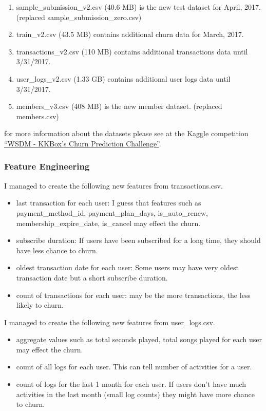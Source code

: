 \documentclass[11pt]{article}
\begin{document}
\begin{enumerate}
\def\labelenumi{\arabic{enumi}.}
\setcounter{enumi}{5}
\itemsep1pt\parskip0pt
\item
  sample\_submission\_v2.csv (40.6 MB) is the new test dataset for
  April, 2017. (replaced sample\_submission\_zero.csv)
\item
  train\_v2.csv (43.5 MB) contains additional churn data for March,
  2017.
\item
  transactions\_v2.csv (110 MB) contains additional transactions data
  until 3/31/2017.
\item
  user\_logs\_v2.csv (1.33 GB) contains additional user logs data until
  3/31/2017.
\item
  members\_v3.csv (408 MB) is the new member dataset. (replaced
  members.csv)
\end{enumerate}

for more information about the datasets please see at the Kaggle
competition
\href{https://www.kaggle.com/c/kkbox-churn-prediction-challenge}{``WSDM
- KKBox's Churn Prediction Challenge''}.

\subsubsection{Feature Engineering}\label{feature-engineering}

I managed to create the following new features from transactions.csv.

\begin{itemize}
\itemsep1pt\parskip0pt
\item
  last transaction for each user: I guess that features such as
  payment\_method\_id, payment\_plan\_days, is\_auto\_renew,
  membership\_expire\_date, is\_cancel may effect the churn.
\item
  subscribe duration: If users have been subscribed for a long time,
  they should have less chance to churn.
\item
  oldest transaction date for each user: Some users may have very oldest
  transaction date but a short subscribe duration.
\item
  count of transactions for each user: may be the more transactions, the
  less likely to churn.
\end{itemize}

I managed to create the following new features from user\_logs.csv.

\begin{itemize}
\itemsep1pt\parskip0pt
\item
  aggregate values such as total seconds played, total songs played for
  each user may effect the churn.
\item
  count of all logs for each user. This can tell number of activities
  for a user.
\item
  count of logs for the last 1 month for each user. If users don't have
  much activities in the last month (small log counts) they might have
  more chance to churn.
\end{itemize}
\end{document}
